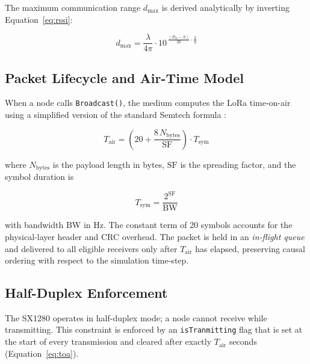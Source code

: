 The maximum communication range $d_\mathrm{max}$ is derived analytically
by inverting Equation~\ref{eq:rssi}:

\begin{equation}
    d_\mathrm{max} = \frac{\lambda}{4\pi}
        \cdot 10^{\,\frac{(P_\mathrm{tx} - S)}{20} \cdot \frac{2}{\eta}}
    \label{eq:dmax}
\end{equation}


\subsection{Packet Lifecycle and Air-Time Model}
\label{sec:lora_airtime}

When a node calls \texttt{Broadcast()}, the medium computes the LoRa time-on-air using a simplified version of
the standard Semtech formula \cite{semtech_sx1280ds}:

\begin{equation}
    T_\mathrm{air} = \left(20 + \frac{8\,N_\mathrm{bytes}}{\mathrm{SF}}\right)
                     \cdot T_\mathrm{sym}
    \label{eq:toa}
\end{equation}

\noindent where $N_\mathrm{bytes}$ is the payload length in bytes,
$\mathrm{SF}$ is the spreading factor, and the symbol duration is

\begin{equation}
    T_\mathrm{sym} = \frac{2^{\mathrm{SF}}}{\mathrm{BW}}
    \label{eq:tsym}
\end{equation}

\noindent with bandwidth BW in Hz. The constant term of 20 symbols
accounts for the physical-layer header and CRC overhead. The packet is
held in an \emph{in-flight queue} and delivered to all eligible
receivers only after $T_\mathrm{air}$ has elapsed, preserving causal
ordering with respect to the simulation time-step.

\subsection{Half-Duplex Enforcement}
\label{sec:lora_halfduplex}

The SX1280 operates in half-duplex mode; a node cannot receive while
transmitting. This constraint is enforced by an
\texttt{isTranmitting} flag that is set at the start of every
transmission and cleared after exactly $T_\mathrm{air}$
seconds (Equation~\ref{eq:toa}). 
